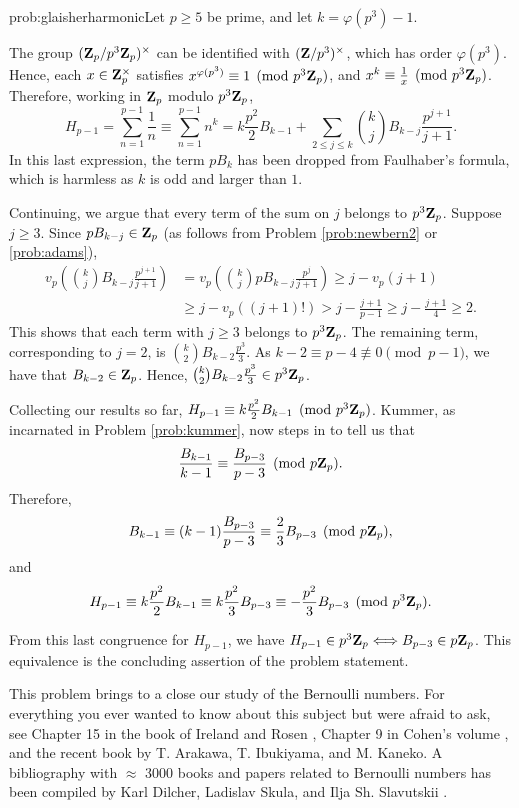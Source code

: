 \begin{sol}{prob:glaisherharmonic}Let $p\ge 5$ be prime, and let $k = \varphi(p^3)-1$.

The group $(\mathbf{Z}_p/p^3\mathbf{Z}_p)^\times$ can be identified with $(\mathbf{Z}/p^3)^{\times}$, which has order $\varphi(p^3)$. Hence, each $x \in \mathbf{Z}_p^{\times}$ satisfies $x^{\varphi(p^3)} \equiv 1\pmod{p^3\mathbf{Z}_p}$, and $x^{k} \equiv \frac1x \pmod{p^3 \mathbf{Z}_{p}}$. Therefore, working in $\mathbf{Z}_p$ modulo $p^3\mathbf{Z}_{p}$,
\[ H_{p-1} = \sum_{n=1}^{p-1} \frac{1}{n} \equiv \sum_{n=1}^{p-1} n^{k} = k\frac{p^2}{2} B_{k-1} + \sum_{2 \le j \le k}\binom{k}{j} B_{k-j} \frac{p^{j+1}}{j+1}.
\]
In this last expression, the term $pB_k$ has been dropped from Faulhaber's formula, which is harmless as $k$ is odd and larger than $1$.

Continuing, we argue that every term of the sum on $j$ belongs to $p^3 \mathbf{Z}_p$. Suppose $j \ge 3$. Since $pB_{k-j} \in \mathbf{Z}_{p}$ (as follows from Problem \ref{prob:newbern2} or \ref{prob:adams}), 
\begin{align*} v_p\left(\binom{k}{j} B_{k-j} \frac{p^{j+1}}{j+1}\right) &= v_p\left(\binom{k}{j} pB_{k-j} \frac{p^{j}}{j+1}\right) \ge j - v_p(j+1) \\ &\ge j - v_p((j+1)!) > j - \frac{j+1}{p-1} \ge j - \frac{j+1}{4} \ge 2.
\end{align*}
This shows that each term with $j\ge 3$ belongs to $p^3 \mathbf{Z}_{p}$. The remaining term, corresponding to $j=2$, is $\binom{k}{2} B_{k-2} \frac{p^3}{3}$. As $k-2\equiv p-4\not\equiv 0\pmod{p-1}$, we have that $B_{k-2} \in \mathbf{Z}_{p}$. Hence, $\binom{k}{2} B_{k-2} \frac{p^3}{3} \in p^3 \mathbf{Z}_p$.

Collecting our results so far, $H_{p-1} \equiv k \frac{p^2}{2} B_{k-1} \pmod{p^3\mathbf{Z}_p}$. Kummer, as incarnated in Problem \ref{prob:kummer}, now steps in to tell us that $$\frac{B_{k-1}}{k-1} \equiv \frac{B_{p-3}}{p-3}\pmod{p\mathbf{Z}_p}.$$
Therefore, 
\[ B_{k-1} \equiv (k-1) \frac{B_{p-3}}{p-3} \equiv \frac{2}{3} B_{p-3}\pmod{p\mathbf{Z}_p}, \] and \[ H_{p-1} \equiv k \frac{p^2}{2} B_{k-1} \equiv k\frac{p^2}{3} B_{p-3}\equiv -\frac{p^2}{3} B_{p-3}\pmod{p^3\mathbf{Z}_{p}}.\] 

From this last congruence for $H_{p-1}$, we have $H_{p-1} \in p^3 \mathbf{Z}_p \Longleftrightarrow B_{p-3} \in p \mathbf{Z}_p$. This equivalence is the concluding assertion of the problem statement.
\end{sol}

\begin{rmk} This problem brings to a close our study of the Bernoulli numbers. For everything you ever wanted to know about this subject but were afraid to ask, see Chapter 15 in the book of Ireland and Rosen \cite{IR}, Chapter 9 in Cohen's volume \cite{cohenbook}, and the recent book \cite{bernoulli} by T. Arakawa, T. Ibukiyama, and M. Kaneko. A bibliography with $\approx$ 3000 books and papers related to Bernoulli numbers has been compiled by Karl Dilcher, Ladislav Skula, and Ilja Sh. Slavutskii \cite{bernoullibib}. 
\end{rmk}


